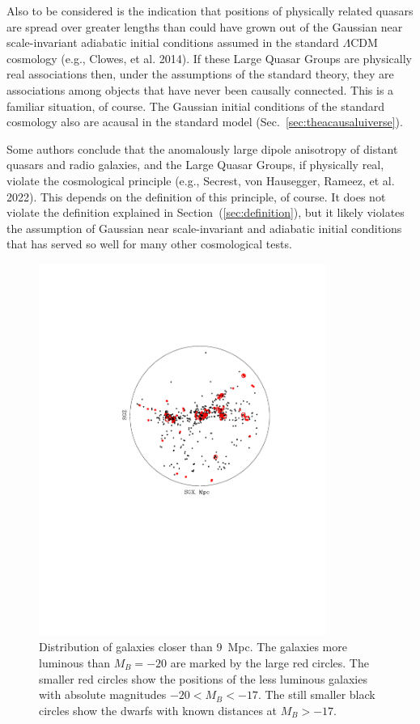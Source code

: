\documentclass[fleqn,usenatbib]{mnras}
\begin{document}
Also to be considered is the indication that positions of physically related quasars are spread over greater lengths than could have grown out of the Gaussian near scale-invariant adiabatic initial conditions assumed in the standard $\Lambda$CDM cosmology (e.g., Clowes, et al. 2014). If these Large Quasar Groups are physically real associations then, under the assumptions of the standard theory, they are associations among objects that have never been causally connected. This is a familiar situation, of course. The Gaussian initial conditions of the standard cosmology also are acausal in the standard model (Sec.~\ref{sec:theacausaluiverse}). 

Some authors conclude that the anomalously large dipole anisotropy of distant quasars and radio galaxies, and the Large Quasar Groups, if physically real, violate the  cosmological principle (e.g., Secrest, von Hausegger, Rameez, et al. 2022). This depends on the definition of this principle, of course. It does not violate the definition explained in Section~(\ref{sec:definition}), but it likely violates the assumption of Gaussian near scale-invariant and adiabatic initial conditions that has served so well for many other cosmological tests. 

\begin{figure}
\begin{center}
\includegraphics[angle=0,width=3.7in]{LocalVol.pdf} 
\caption{Distribution of galaxies closer than 9~Mpc. The galaxies more luminous than $M_B = -20$ are marked by the large red circles. The smaller  red circles show the positions of the less luminous galaxies with absolute magnitudes $-20 < M_B < -17$. The still smaller black circles show the dwarfs with known distances at $M_B > -17$.}\label{fig:LocalVol}
\end{center}
\end{figure}
\end{document}
